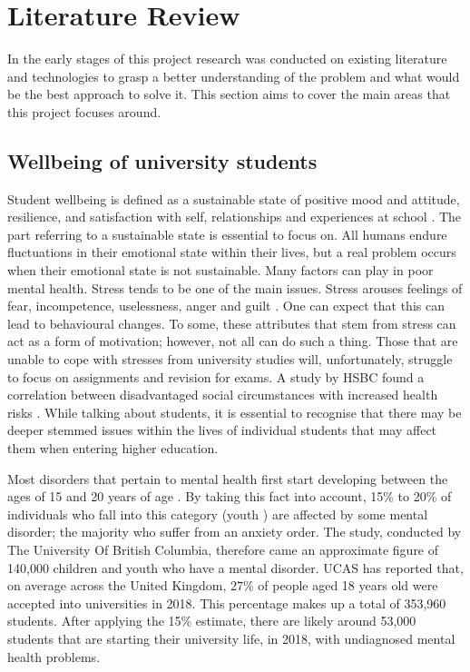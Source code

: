 \section{Literature Review} \label{litreview}

In the early stages of this project research was conducted on existing literature and technologies to grasp a better understanding of the problem and what would be the best approach to solve it.
This section aims to cover the main areas that this project focuses around.

\subsection{Wellbeing of university students}

Student wellbeing is defined as a sustainable state of positive mood and attitude, resilience, and satisfaction with self, relationships and experiences at school \cite{noble2008scoping}.
The part referring to a sustainable state is essential to focus on. All humans endure fluctuations in their emotional state within their lives, but a real problem occurs when their emotional state is not sustainable.
Many factors can play in poor mental health. Stress tends to be one of the main issues. 
Stress arouses feelings of fear, incompetence, uselessness, anger and guilt \cite{turunen2014indoor}. One can expect that this can lead to behavioural changes. 
To some, these attributes that stem from stress can act as a form of motivation; however, not all can do such a thing.
Those that are unable to cope with stresses from university studies will, unfortunately, struggle to focus on assignments and revision for exams.
A study by HSBC found a correlation between disadvantaged social circumstances with increased health risks \cite{currie2009social}.
While talking about students, it is essential to recognise that there may be deeper stemmed issues within the lives of individual students that may affect them when entering higher education.

Most disorders that pertain to mental health first start developing between the ages of 15 and 20 years of age \cite{kessler2005lifetime}.
By taking this fact into account, 15\% to 20\% of individuals who fall into this category (youth \cite{youth2017definition}) are affected by some mental disorder; the majority who suffer from an anxiety order. 
The study, conducted by The University Of British Columbia, therefore came an approximate figure of 140,000 children and youth who have a mental disorder. 
UCAS has reported that, on average across the United Kingdom, 27\% of people aged 18 years old were accepted into universities \cite{ucas_2018} in 2018.
This percentage makes up a total of 353,960 students. 
After applying the 15\% estimate, there are likely around 53,000 students that are starting their university life, in 2018, with undiagnosed mental health problems.

